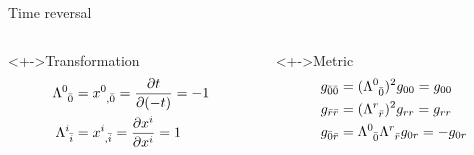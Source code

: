 \documentclass{beamer}
\let\svthefootnote\thefootnote
\newcommand\blankfootnote[1]{%
  \let\thefootnote\relax\footnotetext{#1}%
  \let\thefootnote\svthefootnote%
}
\begin{document}
\begin{frame}{Time reversal}


\begin{columns}[t]
  \begin{column}{0.4\textwidth}
    \begin{block}<+->{Transformation}
      \begin{align*}
        \tensor{\Lambda}{^0_{\bar0}} &=
        \tensor{x}{^0_{,\bar0}} = \pdv{t}{(-t)} = -1
        \\
        \tensor{\Lambda}{^i_{\bar{i}}} &=
        \tensor{x}{^i_{,\bar{i}}} = \pdv{x^i}{x^i} = 1
      \end{align*}
    \end{block}
  \end{column}

  \begin{column}{0.4\textwidth}
    \begin{block}<+->{Metric}
      \begin{align*}
        g_{\bar0 \bar0} &=
        (\tensor{\Lambda}{^0_{\bar0}})^2 g_{00} =
        g_{00}
        \\
        g_{\bar{r} \bar{r}} &=
        (\tensor{\Lambda}{^r_{\bar{r}}})^2 g_{rr} =
        g_{rr}
        \\
        g_{\bar0 \bar{r}} &=
        \tensor{\Lambda}{^0_{\bar0}} \tensor{\Lambda}{^r_{\bar{r}}} g_{0r} =
        -g_{0r}
      \end{align*}
    \end{block}
  \end{column}
\end{columns}

\blankfootnote{\textcite[p. 258]{Schutz}}


\note{

}
\end{frame}
\end{document}
